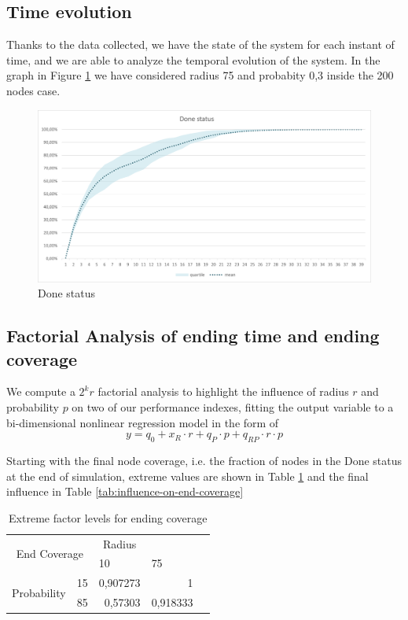 \subsection{Time evolution}
Thanks to the data collected, we have the state of the system for each instant of time, and we are able to analyze the temporal evolution of the system. In the graph in Figure \ref{fig:done-status} we have considered radius 75 and probabity 0,3 inside the 200 nodes case.
\begin{figure}[H]
\centering
    \includegraphics[width= 1\textwidth]{./images/DoneStatus_200N-30p75r.png}
    \caption{Done status}
    \label{fig:done-status}
\end{figure}

\subsection{Factorial Analysis of ending time and ending coverage}

We compute a $2^kr$ factorial analysis to highlight the influence of radius $r$ and probability $p$ on two of our performance indexes, fitting the output variable to a bi-dimensional nonlinear regression model in the form of 
$$
y = q_0 + x_R \cdot r + q_P \cdot p + q_{RP} \cdot r \cdot p
$$

Starting with the final node coverage, i.e. the fraction of nodes in the Done status at the end of simulation, extreme values are shown in Table \ref{tab:extreme-factors-end-coverage} and the final influence in Table \ref{tab:influence-on-end-coverage}

\begin{table}[h!]
\centering
\begin{tabular}{|cl|r|r|l}
\cline{1-4}
\multicolumn{2}{|c|}{\multirow{2}{*}{End Coverage}}     & \multicolumn{1}{c|}{Radius} & \multicolumn{1}{c|}{}   &  \\ \cline{3-4}
\multicolumn{2}{|c|}{}                                  & \multicolumn{1}{l|}{10}     & \multicolumn{1}{l|}{75} &  \\ \cline{1-4}
\multicolumn{1}{|c|}{\multirow{2}{*}{Probability}} & 15 & 0,907273                    & 1                       &  \\ \cline{2-4}
\multicolumn{1}{|c|}{}                             & 85 & 0,57303                     & 0,918333                &  \\ \cline{1-4}
\end{tabular}
\caption{Extreme factor levels for ending coverage}
\label{tab:extreme-factors-end-coverage}
\end{table}

